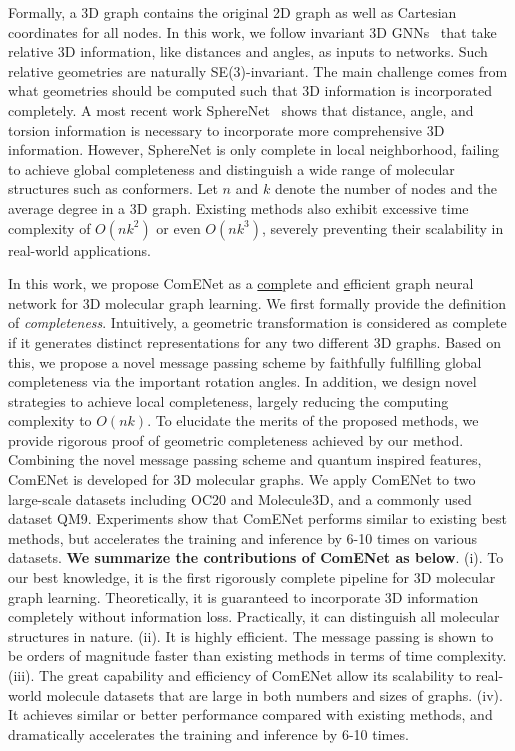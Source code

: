 \documentclass{article}
\begin{document}
Formally, a 3D graph contains the original 2D graph as well as Cartesian coordinates for all nodes. In this work, we follow
invariant 3D GNNs~\citep{schutt2017schnet,klicpera_dimenet_2020,klicpera_dimenetpp_2020,shuaibi2021rotation,liu2022spherical,klicpera2021gemnet} 
that take relative 3D information,
like distances and angles, as inputs to networks.
Such relative geometries are naturally SE(3)-invariant.
The main challenge comes from what geometries should be computed such that 3D information is incorporated completely.
A most recent work SphereNet~\citep{liu2022spherical} 
shows that distance, angle, and torsion information is
necessary to incorporate more comprehensive 3D information.
However, SphereNet is only complete in local neighborhood,
failing to achieve global completeness and distinguish a wide range of molecular structures such
as conformers.
\textcolor{COLOR}{Let $n$ and $k$ denote the number of nodes and the average degree in a 3D graph.}
Existing methods also exhibit excessive time complexity of
$O(nk^2)$ or even $O(nk^3)$, severely preventing their scalability in real-world applications.

 
In this work, we propose ComENet as a \underline{com}plete and \underline{e}fficient graph neural network for 3D molecular graph learning.
We first formally provide the definition of \emph{completeness}.
Intuitively, a geometric transformation is considered as complete if it generates distinct representations for any two different 3D graphs.
Based on this, we propose a novel message passing scheme by faithfully fulfilling global completeness via the important rotation angles.
In addition, we design novel strategies to achieve local completeness,
largely reducing the computing complexity to $O(nk)$.
To elucidate the merits of the proposed methods,
we provide rigorous proof of geometric completeness achieved
by our method.
Combining the novel message passing scheme and quantum inspired features,
ComENet is developed for 3D molecular graphs.
We apply ComENet to two large-scale datasets including OC20 and  Molecule3D, and a 
commonly used dataset QM9.
Experiments show that ComENet performs similar to existing best methods,
but accelerates the training and inference by 6-10 times on various datasets.
\textbf{We summarize the contributions of ComENet as below}.
(i). To our best knowledge, it is the first rigorously complete pipeline for 3D molecular graph learning. Theoretically, it is guaranteed to incorporate 3D information completely without information loss. Practically, it can distinguish all molecular structures in nature.
(ii). It is highly efficient. The message passing is shown to be orders of magnitude faster than existing methods in terms of time complexity.
(iii). The great capability and efficiency of ComENet allow its scalability to real-world molecule datasets that are large in both numbers and sizes of graphs.
(iv). It achieves similar or better performance compared with existing methods, and dramatically accelerates the training and inference by 6-10 times.
\end{document}
